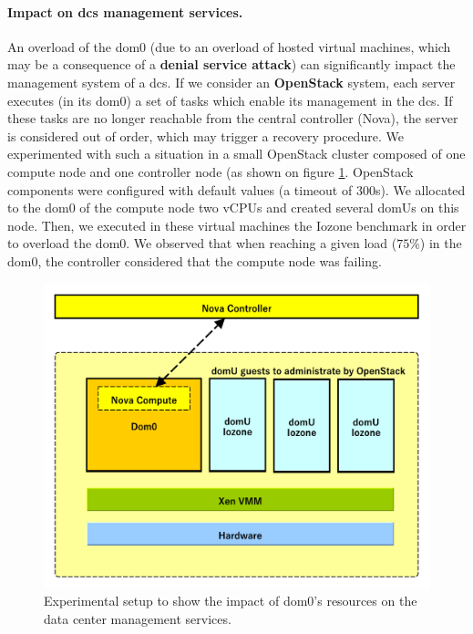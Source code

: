 \paragraph{Impact on \glspl{dc} management services.} An overload of the dom0 (due to an overload of hosted virtual machines, which may be a consequence of a \textbf{denial service attack}) can significantly impact the management system of a \glspl{dc}. If we consider an \textbf{OpenStack} system, each server executes (in its dom0) a set of tasks which enable its management in the \glspl{dc}. If these tasks are no longer reachable from the central controller (Nova), the server is considered out of order, which may trigger a recovery procedure. We experimented with such a situation in a small OpenStack cluster composed of one compute node and one controller node (as shown on figure \ref{fig:expe4}. OpenStack components were configured with default values (a timeout of 300s). We allocated to the dom0 of the compute node two vCPUs and created several domUs on this node. Then, we executed in these virtual machines the Iozone benchmark in order to overload the dom0. We observed that when reaching a given load ($75\%$) in the dom0, the controller considered that the compute node was failing.

\begin{figure}[!h]
\centering
\includegraphics[scale=0.65]{fig03/expe4.pdf}
\caption{Experimental setup to show the impact of dom0's resources on the data center management services.}
\label{fig:expe4}
\end{figure}

